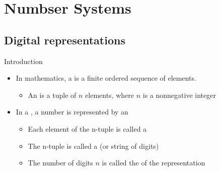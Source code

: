 
\chapter{Numbser Systems}
\section{Digital representations}
\begin{parag}{Introduction}
    \begin{itemize}
        \item In mathematics, a  is a finite ordered sequence of elements. 
        \begin{itemize}
            \item An  is a tuple of $n$ elements, where $n$ is a nonnegative integer
        \end{itemize}
        \item In a , a number is represented by an 
        \begin{itemize}
            \item Each element of the n-tuple is called a  
            \item The n-tuple is called a  (or string of digits)
            \item The number of digits $n$ is called the  of the representation
        \end{itemize}
    \end{itemize}
\end{parag}
